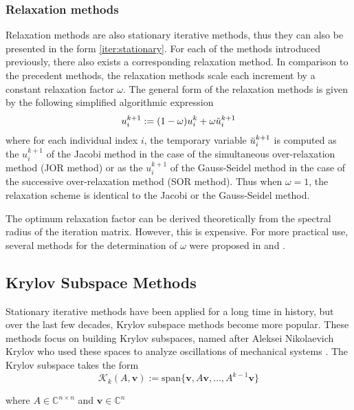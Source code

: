 \subsubsection{Relaxation methods}
Relaxation methods are also stationary iterative methods, thus they can also be presented in the form \autoref{iter:stationary}. For each of the methods introduced previously, there also exists a corresponding relaxation method.
In comparison to the precedent methods, the relaxation methods scale each increment by a constant relaxation factor $\omega$. The general form of the relaxation methods is given by the following simplified algorithmic expression
\begin{align}
    u_{i}^{k+1} := (1-\omega)u_i^k + \omega \Breve{u}_i^{k+1}
\end{align}
where for each individual index $i$, the temporary variable $\Breve{u}_i^{k+1}$ is computed as the $u_i^{k+1}$ of the Jacobi method in the case of the simultaneous over-relaxation method (JOR method) or as the $u_i^{k+1}$ of the Gauss-Seidel method in the case of the successive over-relaxation method (SOR method). Thus when $\omega = 1$, the relaxation scheme is identical to the Jacobi or the Gauss-Seidel method.

The optimum relaxation factor can be derived theoretically from the spectral radius of the iteration matrix. However, this is expensive. For more practical use, several methods for the determination of $\omega$ were proposed in \cite{https://doi.org/10.1002/zamm.19940740205} and \cite{young2014iterative}.


\subsection{Krylov Subspace Methods}
\label{section:krylov_subspace}
Stationary iterative methods have been applied for a long time in history, but over the last few decades, Krylov subspace methods become more popular. These methods focus on building Krylov subspaces, named after Aleksei Nikolaevich Krylov who used these spaces to analyze oscillations of mechanical systems \cite{krylov1931numerical}. The Krylov subspace takes the form
\begin{equation}
    \mathcal{K}_k(A,\boldsymbol{v}) := \text{span}\{\boldsymbol{v},A\boldsymbol{v},\dots,A^{k-1}\boldsymbol{v}\}
\end{equation}

where $A \in \mathbb{C}^{n\times n}$ and $\boldsymbol{v} \in \mathbb{C}^n$


